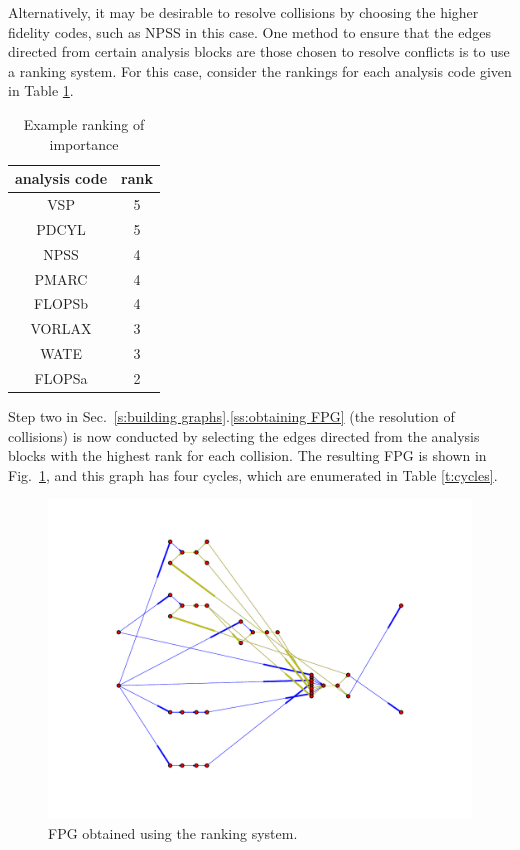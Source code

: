 	Alternatively, it may be desirable to resolve collisions by choosing the higher fidelity codes, such as NPSS in this case.
	One method to ensure that the edges directed from certain analysis blocks are those chosen to resolve conflicts is to use a ranking system. 
	For this case, consider the rankings for each analysis code given in Table \ref{t:rankings}.
	\begin{table}[htbp]
	  \centering
	  \caption{Example ranking of importance}
		\begin{tabular}{cc}
		\toprule
		analysis code & rank \\
		\midrule
		VSP   & 5 \\
		PDCYL & 5 \\
		NPSS  & 4 \\
		PMARC & 4 \\
		FLOPSb & 4 \\
		VORLAX & 3 \\
		WATE  & 3 \\
		FLOPSa & 2 \\
		\bottomrule
		\end{tabular}%
	  \label{t:rankings}%
	\end{table}%
	Step two in Sec.~\ref{s:building graphs}.\ref{ss:obtaining FPG} (the resolution of collisions) is now conducted by selecting the edges directed from the analysis blocks with the highest rank for each collision. 
	The resulting FPG is shown in Fig.~\ref{f:FPG highest rank}, and this graph has four cycles, which are enumerated in Table \ref{t:cycles}.
	\begin{figure}[htb!]
	  \begin{center}
		\includegraphics[width=.6\textwidth]{images/FPG_highest_rank}
	  \end{center}
	  \caption{FPG obtained using the ranking system.}
	\label{f:FPG highest rank}
	\end{figure}
